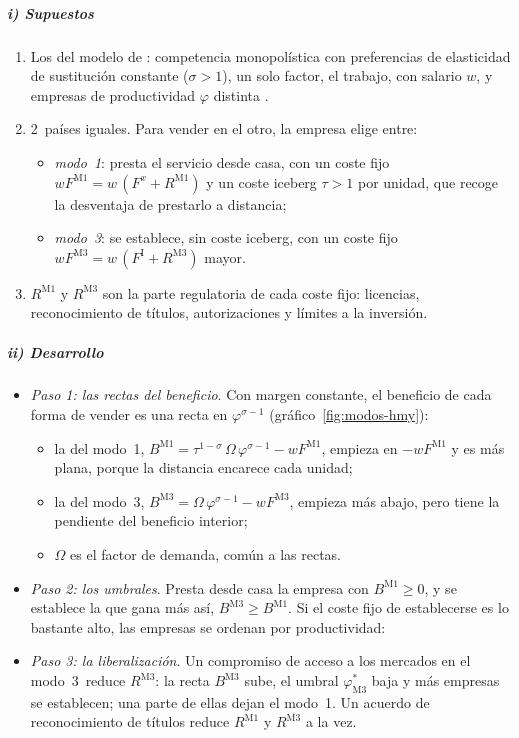 \documentclass[11pt]{article}
\begin{document}
\subparagraph{i) Supuestos}

\begin{enumerate}
\item Los del modelo de : competencia monopolística con preferencias de elasticidad de sustitución constante ($\sigma>1$), un solo factor, el trabajo, con salario $w$, y empresas de productividad $\varphi$ distinta .
\item 2~países iguales. Para vender en el otro, la empresa elige entre:
  \begin{itemize}
  \item \emph{modo~1}: presta el servicio desde casa, con un coste fijo $wF^{\mathrm{M1}}=w\,(F^x+R^{\mathrm{M1}})$ y un coste iceberg $\tau>1$ por unidad, que recoge la desventaja de prestarlo a distancia;
  \item \emph{modo~3}: se establece, sin coste iceberg, con un coste fijo $wF^{\mathrm{M3}}=w\,(F^{\mathrm I}+R^{\mathrm{M3}})$ mayor.
  \end{itemize}
\item $R^{\mathrm{M1}}$ y $R^{\mathrm{M3}}$ son la parte regulatoria de cada coste fijo: licencias, reconocimiento de títulos, autorizaciones y límites a la inversión.
\end{enumerate}

\subparagraph{ii) Desarrollo}

\begin{itemize}
\item \emph{Paso 1: las rectas del beneficio}. Con margen constante, el beneficio de cada forma de vender es una recta en $\varphi^{\sigma-1}$ (gráfico~\ref{fig:modos-hmy}):
  \begin{itemize}
  \item la del modo~1, $B^{\mathrm{M1}}=\tau^{1-\sigma}\,\Omega\,\varphi^{\sigma-1}-wF^{\mathrm{M1}}$, empieza en $-wF^{\mathrm{M1}}$ y es más plana, porque la distancia encarece cada unidad;
  \item la del modo~3, $B^{\mathrm{M3}}=\Omega\,\varphi^{\sigma-1}-wF^{\mathrm{M3}}$, empieza más abajo, pero tiene la pendiente del beneficio interior;
  \item $\Omega$ es el factor de demanda, común a las rectas.
  \end{itemize}
\item \emph{Paso 2: los umbrales}. Presta desde casa la empresa con $B^{\mathrm{M1}}\geq0$, y se establece la que gana más así, $B^{\mathrm{M3}}\geq B^{\mathrm{M1}}$. Si el coste fijo de establecerse es lo bastante alto, las empresas se ordenan por productividad:
\item \emph{Paso 3: la liberalización}. Un compromiso de acceso a los mercados en el modo~3~reduce $R^{\mathrm{M3}}$: la recta $B^{\mathrm{M3}}$ sube, el umbral $\varphi^*_{\mathrm{M3}}$ baja y más empresas se establecen; una parte de ellas dejan el modo~1. Un acuerdo de reconocimiento de títulos reduce $R^{\mathrm{M1}}$ y $R^{\mathrm{M3}}$ a la vez.
\end{itemize}
\end{document}
